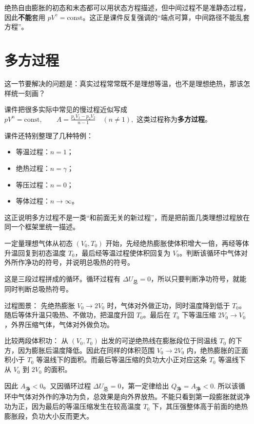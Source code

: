 \documentclass[lang=cn,11pt]{elegantbook}
\begin{document}
\begin{remark}
绝热自由膨胀的初态和末态都可以用状态方程描述，但中间过程不是准静态过程，因此\textbf{不能}套用 \(pV^\gamma=\text{const}\)。这正是课件反复强调的“端点可算，中间路径不能乱套方程”。
\end{remark}

\section{多方过程}

这一节要解决的问题是：真实过程常常既不是理想等温，也不是理想绝热，那该怎样统一刻画？

课件把很多实际中常见的慢过程近似写成
 \(pV^n=\text{const},\qquad A=\frac{p_1V_1-p_2V_2}{n-1}\quad (n\neq1),\) 
这类过程称为\textbf{多方过程}。

课件还特别整理了几种特例：
\begin{itemize}
 \item 等温过程：\(n=1\)；
 \item 绝热过程：\(n=\gamma\)；
 \item 等压过程：\(n=0\)；
 \item 等体过程：\(n\to\infty\)。
\end{itemize}

\begin{note}
这正说明多方过程不是一类“和前面无关的新过程”，而是把前面几类理想过程放在同一个框架里统一描述。
\end{note}

\begin{exercise}
一定量理想气体从初态 \((V_0,T_0)\) 开始，先经绝热膨胀使体积增大一倍，再经等体升温回复到初态温度 \(T_0\)，最后经等温过程使体积回复为 \(V_0\)。判断该循环中气体对外所作净功的符号，并说明总吸热的符号。
\end{exercise}

\begin{solution}
这是三段过程拼成的循环。循环过程有 \(\Delta U_{\text{总}}=0\)，所以只要判断净功符号，就能同时判断总吸热符号。

过程图景： 先绝热膨胀 \(V_0\to2V_0\) 时，气体对外做正功，同时温度降到低于 \(T_0\)。随后等体升温只吸热、不做功，把温度升回 \(T_0\)。最后在 \(T_0\) 下等温压缩 \(2V_0\to V_0\)，外界压缩气体，气体对外做负功。

比较两段体积功： 从 \((V_0,T_0)\) 出发的可逆绝热线在膨胀段位于同温线 \(T_0\) 的下方，因为膨胀后温度降低。因此在同样的体积范围 \(V_0\to2V_0\) 内，绝热膨胀的正面积小于 \(T_0\) 等温线下的面积。而最后等温压缩的负功大小正对应这条 \(T_0\) 等温线下从 \(V_0\) 到 \(2V_0\) 的面积。

因此 \(A_{\text{净}}<0\)。又因循环过程 \(\Delta U_{\text{总}}=0\)，第一定律给出
 \(Q_{\text{净}}=A_{\text{净}}<0.\) 
所以该循环中气体对外作的净功为负，总效果是向外界放热。不能只看到第一段膨胀就说净功为正，因为最后的等温压缩发生在较高温度 \(T_0\) 下，其压强整体高于前面的绝热膨胀段，负功大小反而更大。
\end{solution}
\end{document}
